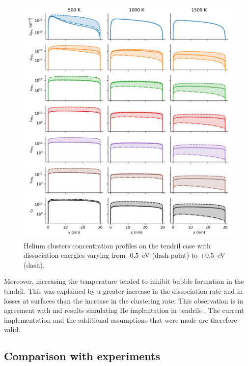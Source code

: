\begin{figure}
    \includegraphics[width=\linewidth]{Figures/Chapter5/parametric_study_dissociation_energies.pdf}
    \caption{Helium clusters concentration profiles on the tendril case with dissociation energies varying from -\SI{0.5}{eV} (dash-point) to +\SI{0.5}{eV} (dash).}
\end{figure}


Moreover, increasing the temperature tended to inhibit bubble formation in the \gls{tendril}.
This was explained by a greater increase in the dissociation rate and in losses at surfaces than the increase in the clustering rate.
This observation is in agreement with \gls{md} results simulating He implantation in \glspl{tendril} .
The current implementation and the additional assumptions that were made are therefore valid.

\subsection{Comparison with experiments}

